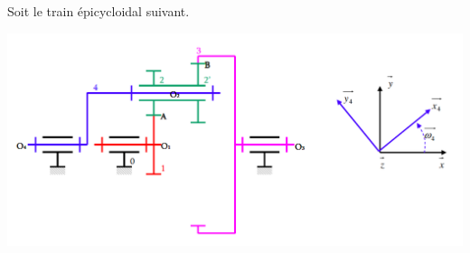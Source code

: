 Soit le train épicycloidal suivant.
\begin{center}
\includegraphics[scale=0.35]{png/train-double.png}
\end{center}

